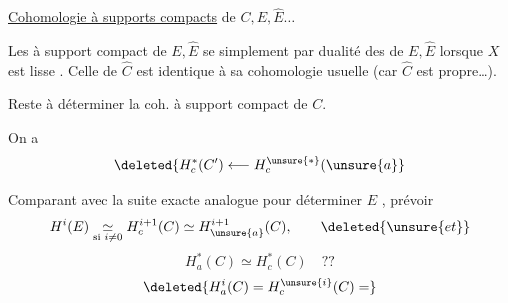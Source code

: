 \uline{Cohomologie à supports compacts}  de $C,E,\widehat E\ldots$

Les  à support compact de $E,\widehat E$ se  simplement par dualité des  de $E,\widehat E$ lorsque $X$ est lisse \unsure{\ldots\ (\ldots}. Celle de $\widehat C$ est identique à sa cohomologie usuelle (car $\widehat C$ est propre\ldots).

Reste à déterminer la coh. à support compact de $C$.

On a
\[
\deleted{H_c^*(C')\longleftarrow H_c^{\unsure{*}}(\unsure{a}}
\]

Comparant avec la suite exacte analogue pour déterminer  $E$ ,  prévoir
\[
H^i(E)\underset{\text{si }i\neq0}{\simeq}H_c^{i+1}(C)
\simeq H_{\unsure{a}}^{i+1}(C),
\qquad \deleted{\unsure{et}}
\]
\[
\boxed{H_a^*(C)\simeq H_c^*(C)\quad ??}
\]
\[
\deleted{H_a^i(C)=H_c^{\unsure{i}}(C)=}
\]
